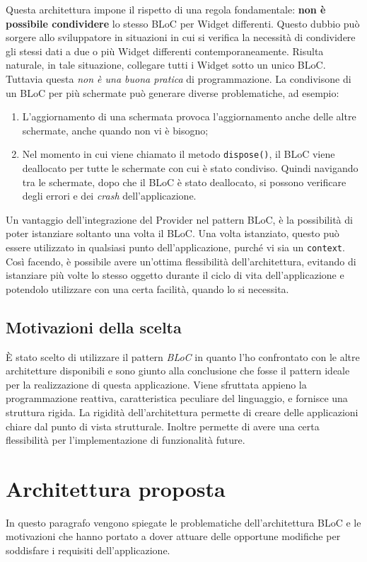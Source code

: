 Questa architettura impone il rispetto di una regola fondamentale: \textbf{non è possibile condividere} lo stesso BLoC per Widget differenti. Questo dubbio può sorgere allo sviluppatore in situazioni in cui si verifica la necessità di condividere gli stessi dati a due o più Widget differenti contemporaneamente. Risulta naturale, in tale situazione, collegare tutti i Widget sotto un unico BLoC. Tuttavia questa \textit{non è una buona pratica} di programmazione. La condivisone di un BLoC per più schermate può generare diverse problematiche, ad esempio:
\begin{enumerate}
	\item L'aggiornamento di una schermata provoca l'aggiornamento anche delle altre schermate, anche quando non vi è bisogno;
	\item Nel momento in cui viene chiamato il metodo \verb|dispose()|, il BLoC viene deallocato per tutte le schermate con cui è stato condiviso. Quindi navigando tra le schermate, dopo che il BLoC è stato deallocato, si possono verificare degli errori e dei \textit{crash} dell'applicazione.
\end{enumerate}

Un vantaggio dell'integrazione del Provider nel pattern BLoC, è la possibilità di poter istanziare soltanto una volta il BLoC. Una volta istanziato, questo può essere utilizzato in qualsiasi punto dell'applicazione, purché vi sia un \verb|context|. Così facendo, è possibile avere un'ottima flessibilità dell'architettura, evitando di istanziare più volte lo stesso oggetto durante il ciclo di vita dell'applicazione e potendolo utilizzare con una certa facilità, quando lo si necessita.

\subsection{Motivazioni della scelta}
È stato scelto di utilizzare il pattern \textit{BLoC} in quanto l'ho confrontato con le altre architetture disponibili e sono giunto alla conclusione che fosse il pattern ideale per la realizzazione di questa applicazione. Viene sfruttata appieno la programmazione reattiva, caratteristica peculiare del linguaggio, e fornisce una struttura rigida. La rigidità dell'architettura permette di creare delle applicazioni chiare dal punto di vista strutturale. Inoltre permette di avere una certa flessibilità per l'implementazione di funzionalità future.

\section{Architettura proposta}
In questo paragrafo vengono spiegate le problematiche dell'architettura BLoC e le motivazioni che hanno portato a dover attuare delle opportune modifiche per soddisfare i requisiti dell'applicazione.

